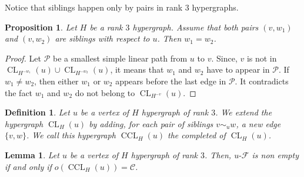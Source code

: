\documentclass{article}
\newcommand{\hyp}{H}
\newcommand{\hedge}{edge\xspace}
\DeclareMathOperator{\CL}{CL}
\DeclareMathOperator{\CCL}{CCL}
\newcommand{\Client}{\mathcal{C}}
\newcommand{\uCwin}{u\text{-}\mathcal{F}}
\newtheorem{lemma}[theorem]{Lemma}
\newtheorem{definition}[theorem]{Definition}
\newtheorem{proposition}[theorem]{Proposition}
\begin{document}
Notice that siblings happen only by pairs in rank \(3\) hypergraphs.
\begin{proposition}
    Let \(\hyp\) be a rank \(3\) hypergraph.
	Assume that both pairs \((v,w_1)\) and \((v,w_2)\) are siblings with respect to \(u\). Then \(w_1=w_2\).
\end{proposition}

\begin{proof}
	Let \(\mathcal{P}\) be a smallest simple linear path from \(u\) to \(v\). Since, \(v\) is not in \(\CL_{H^{-w_1}}(u) \cup \CL_{H^{-w_2}}(u)\), it means that \(w_1\) and \(w_2\) have to appear in \(\mathcal{P}\).  If \(w_1 \neq w_2\), then either \(w_1\) or \(w_2\) appears before the last \hedge in \(\mathcal{P}\). It contradicts the fact \(w_1\) and \(w_2\) do not belong to \(\CL_{H^{-v}}(u)\).
\end{proof}


\begin{definition}
	Let  \(u\) be a vertex of \(H\) hypergraph of rank \(3\). 
	We extend the hypergraph \(\CL_H(u)\) by adding, for each pair of siblings \(v \sim_u w\), a new \hedge \(\{v,w\}\). We call this hypergraph \(\CCL_H(u)\) the {\em completed} of \(\CL_H(u)\). 
\end{definition}

\begin{lemma}\label{lem:CC_iff_Tadpole}
	Let \(u\) be a vertex of \(H\) hypergraph of rank \(3\). Then, \(\uCwin\) is non empty if and only if \(o(\CCL_{H}(u)) = \Client\).
\end{lemma}
\end{document}

